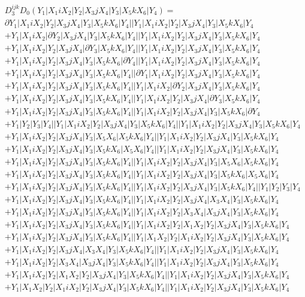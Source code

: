 \documentclass{article}[12pt]
\begin{document}
\begin{align*}
&D_3^{ijk}D_0(Y_1|X_1iX_2|Y_2|X_3jX_4|Y_3|X_5kX_6|Y_4) =\\ 
& \partial Y_1|X_1iX_2|Y_2|X_3jX_4|Y_3|X_5kX_6|Y_4||Y_1|X_1iX_2|Y_2|X_3jX_4|Y_3|X_5kX_6|Y_4\\ 
& + Y_1|X_1iX_2|\partial Y_2|X_3jX_4|Y_3|X_5kX_6|Y_4||Y_1|X_1iX_2|Y_2|X_3jX_4|Y_3|X_5kX_6|Y_4\\
& + Y_1|X_1iX_2|Y_2|X_3jX_4|\partial Y_3|X_5kX_6|Y_4||Y_1|X_1iX_2|Y_2|X_3jX_4|Y_3|X_5kX_6|Y_4\\
& + Y_1|X_1iX_2|Y_2|X_3jX_4|Y_3|X_5kX_6|\partial Y_4||Y_1|X_1iX_2|Y_2|X_3jX_4|Y_3|X_5kX_6|Y_4\\
& + Y_1|X_1iX_2|Y_2|X_3jX_4|Y_3|X_5kX_6|Y_4||\partial Y_1|X_1iX_2|Y_2|X_3jX_4|Y_3|X_5kX_6|Y_4\\
& + Y_1|X_1iX_2|Y_2|X_3jX_4|Y_3|X_5kX_6|Y_4||Y_1|X_1iX_2|\partial Y_2|X_3jX_4|Y_3|X_5kX_6|Y_4\\
& + Y_1|X_1iX_2|Y_2|X_3jX_4|Y_3|X_5kX_6|Y_4||Y_1|X_1iX_2|Y_2|X_3jX_4|\partial Y_3|X_5kX_6|Y_4\\
& + Y_1|X_1iX_2|Y_2|X_3jX_4|Y_3|X_5kX_6|Y_4||Y_1|X_1iX_2|Y_2|X_3jX_4|Y_3|X_5kX_6|\partial Y_4\\
 & +Y_1|Y_2|Y_3|Y_4||Y_1|X_1iX_2|Y_2|X_3jX_4|Y_3|X_5kX_6|Y_4||Y_1|X_1iX_2|Y_2|X_3jX_4|Y_3|X_5kX_6|Y_4\\ 
 & +Y_1|X_1iX_2|Y_2|X_3jX_4|Y_3|X_5X_6|X_5kX_6|Y_4||Y_1|X_1iX_2|Y_2|X_3jX_4|Y_3|X_5kX_6|Y_4\\ 
 & +Y_1|X_1iX_2|Y_2|X_3jX_4|Y_3|X_5kX_6|X_5X_6|Y_4||Y_1|X_1iX_2|Y_2|X_3jX_4|Y_3|X_5kX_6|Y_4\\ 
 & +Y_1|X_1iX_2|Y_2|X_3jX_4|Y_3|X_5kX_6|Y_4||Y_1|X_1iX_2|Y_2|X_3jX_4|Y_3|X_5X_6|X_5kX_6|Y_4\\ 
 & +Y_1|X_1iX_2|Y_2|X_3jX_4|Y_3|X_5kX_6|Y_4||Y_1|X_1iX_2|Y_2|X_3jX_4|Y_3|X_5kX_6|X_5X_6|Y_4\\ 
 & +Y_1|X_1iX_2|Y_2|X_3jX_4|Y_3|X_5kX_6|Y_4||Y_1|X_1iX_2|Y_2|X_3jX_4|Y_3|X_5kX_6|Y_4||Y_1|Y_2|Y_3|Y_4\\ 
 & +Y_1|X_1iX_2|Y_2|X_3jX_4|Y_3|X_5kX_6|Y_4||Y_1|X_1iX_2|Y_2|X_3jX_4|X_3X_4|Y_3|X_5kX_6|Y_4\\ 
 & +Y_1|X_1iX_2|Y_2|X_3jX_4|Y_3|X_5kX_6|Y_4||Y_1|X_1iX_2|Y_2|X_3X_4|X_3jX_4|Y_3|X_5kX_6|Y_4\\ 
 & +Y_1|X_1iX_2|Y_2|X_3jX_4|Y_3|X_5kX_6|Y_4||Y_1|X_1iX_2|Y_2|X_1X_2|Y_2|X_3jX_4|Y_3|X_5kX_6|Y_4\\ 
 & +Y_1|X_1iX_2|Y_2|X_3jX_4|Y_3|X_5kX_6|Y_4||Y_1|X_1X_2|Y_2|X_1iX_2|Y_2|X_3jX_4|Y_3|X_5kX_6|Y_4\\ 
 & +Y_1|X_1iX_2|Y_2|X_3jX_4|X_3X_4|Y_3|X_5kX_6|Y_4||Y_1|X_1iX_2|Y_2|X_3jX_4|Y_3|X_5kX_6|Y_4\\ 
 & +Y_1|X_1iX_2|Y_2|X_3X_4|X_3jX_4|Y_3|X_5kX_6|Y_4||Y_1|X_1iX_2|Y_2|X_3jX_4|Y_3|X_5kX_6|Y_4\\ 
 & +Y_1|X_1iX_2|Y_2|X_1X_2|Y_2|X_3jX_4|Y_3|X_5kX_6|Y_4||Y_1|X_1iX_2|Y_2|X_3jX_4|Y_3|X_5kX_6|Y_4\\ 
 & +Y_1|X_1X_2|Y_2|X_1iX_2|Y_2|X_3jX_4|Y_3|X_5kX_6|Y_4||Y_1|X_1iX_2|Y_2|X_3jX_4|Y_3|X_5kX_6|Y_4\end{align*}
 
 
\end{document}

